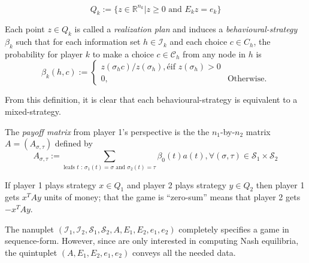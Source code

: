 \documentclass{article} %
\begin{document}
\begin{equation}
  Q_k := \{z \in \mathbb{R}^{n_k}| z \ge 0\text{ and }E_kz = e_k\}
  \label{eq:poly}
\end{equation}

Each point $z \in Q_k$ is called a \textit{realization plan} and induces a \textit{behavioural-strategy} $\beta_k$ such that for each information set $h \in \mathcal{I}_k$ and each choice $c \in C_h$, the probability for player $k$ to make a choice $c \in \mathcal{C}_h$ from any node in $h$ is
\begin{equation}
  \beta_k(h, c) := \begin{cases}
    z(\sigma_hc)/z(\sigma_h), é\mbox{if } z(\sigma_h) > 0\\
    0, &\mbox{Otherwise}.
  \end{cases}
\end{equation}

From this definition, it is clear that each behavioural-strategy is equivalent to a mixed-strategy.


The \textit{payoff matrix} from player 1's perspective is the the $n_1$-by-$n_2$ matrix $A = (A_{\sigma,\tau})$ defined by
\begin{equation}
    A_{\sigma,\tau} := \sum_{\text{leafs }t\text{ : } \sigma_1(t) = \sigma\text{ and } \sigma_2(t) = \tau}{\beta_0(t)a(t)}, \forall (\sigma, \tau) \in \mathcal{S}_1 \times \mathcal{S}_2
  \end{equation}

If player 1 plays strategy $x \in Q_1$ and player 2 plays strategy $y \in Q_2$ then player 1 gets $x^TAy$ units of money; that the game is ``zero-sum'' means that player 2 gets $-x^TAy$.

The nanuplet $(\mathcal{I}_1, \mathcal{I}_2, \mathcal{S}_1, \mathcal{S}_2, A, E_1, E_2, e_1, e_2)$ completely specifies a game in sequence-form. However, since are only interested in computing Nash equilibria, the quintuplet $(A, E_1, E_2, e_1, e_2)$ conveys all the needed data.
\end{document}
